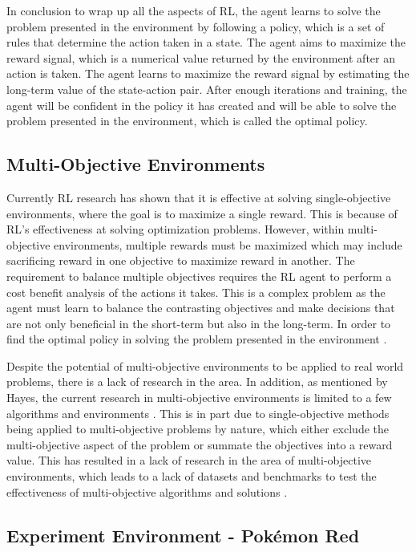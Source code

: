 In conclusion to wrap up all the aspects of RL, the agent learns to solve the problem presented in the environment by following a policy, which is a set of rules that determine the action taken in a state. The agent aims to maximize the reward signal, which is a numerical value returned by the environment after an action is taken. The agent learns to maximize the reward signal by estimating the long-term value of the state-action pair. After enough iterations and training, the agent will be confident in the policy it has created and will be able to solve the problem presented in the environment, which is called the optimal policy.

\subsection{Multi-Objective Environments}

Currently RL research has shown that it is effective at solving single-objective environments, where the goal is to maximize a single reward. This is because of RL's effectiveness at solving optimization problems. However, within multi-objective environments, multiple rewards must be maximized which may include sacrificing reward in one objective to maximize reward in another. The requirement to balance multiple objectives requires the RL agent to perform a cost benefit analysis of the actions it takes. This is a complex problem as the agent must learn to balance the contrasting objectives and make decisions that are not only beneficial in the short-term but also in the long-term. In order to find the optimal policy in solving the problem presented in the environment \cite{hayes2022practical}. 

Despite the potential of multi-objective environments to be applied to real world problems, there is a lack of research in the area. In addition, as mentioned by Hayes, the current research in multi-objective environments is limited to a few algorithms and environments \cite{hayes2022practical}. This is in part due to single-objective methods being applied to multi-objective problems by nature, which either exclude the multi-objective aspect of the problem or summate the objectives into a reward value. This has resulted in a lack of research in the area of multi-objective environments, which leads to a lack of datasets and benchmarks to test the effectiveness of multi-objective algorithms and solutions \cite{hayes2022practical}.

\subsection{Experiment Environment - Pokémon Red}

